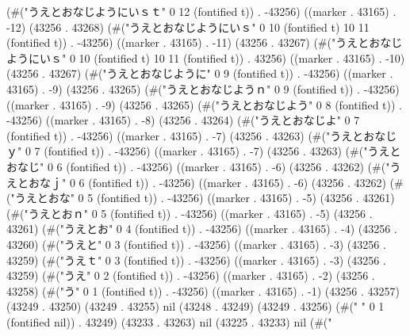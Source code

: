 (#("うえとおなじようにいｓｔ" 0 12 (fontified t)) . -43256) ((marker . 43165) . -12) (43256 . 43268) (#("うえとおなじようにいｓ" 0 10 (fontified t) 10 11 (fontified t)) . -43256) ((marker . 43165) . -11) (43256 . 43267) (#("うえとおなじようにいｓ" 0 10 (fontified t) 10 11 (fontified t)) . 43256) ((marker . 43165) . -10) (43256 . 43267) (#("うえとおなじように" 0 9 (fontified t)) . -43256) ((marker . 43165) . -9) (43256 . 43265) (#("うえとおなじようｎ" 0 9 (fontified t)) . -43256) ((marker . 43165) . -9) (43256 . 43265) (#("うえとおなじよう" 0 8 (fontified t)) . -43256) ((marker . 43165) . -8) (43256 . 43264) (#("うえとおなじよ" 0 7 (fontified t)) . -43256) ((marker . 43165) . -7) (43256 . 43263) (#("うえとおなじｙ" 0 7 (fontified t)) . -43256) ((marker . 43165) . -7) (43256 . 43263) (#("うえとおなじ" 0 6 (fontified t)) . -43256) ((marker . 43165) . -6) (43256 . 43262) (#("うえとおなｊ" 0 6 (fontified t)) . -43256) ((marker . 43165) . -6) (43256 . 43262) (#("うえとおな" 0 5 (fontified t)) . -43256) ((marker . 43165) . -5) (43256 . 43261) (#("うえとおｎ" 0 5 (fontified t)) . -43256) ((marker . 43165) . -5) (43256 . 43261) (#("うえとお" 0 4 (fontified t)) . -43256) ((marker . 43165) . -4) (43256 . 43260) (#("うえと" 0 3 (fontified t)) . -43256) ((marker . 43165) . -3) (43256 . 43259) (#("うえｔ" 0 3 (fontified t)) . -43256) ((marker . 43165) . -3) (43256 . 43259) (#("うえ" 0 2 (fontified t)) . -43256) ((marker . 43165) . -2) (43256 . 43258) (#("う" 0 1 (fontified t)) . -43256) ((marker . 43165) . -1) (43256 . 43257) (43249 . 43250) (43249 . 43255) nil (43248 . 43249) (43249 . 43256) (#("	" 0 1 (fontified nil)) . 43249) (43233 . 43263) nil (43225 . 43233) nil (#("
